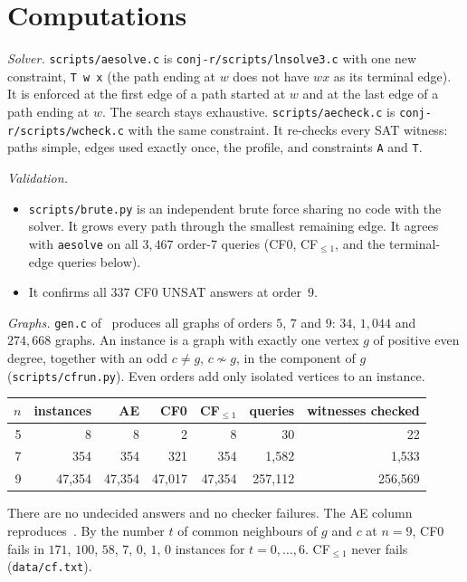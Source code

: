 \documentclass[11pt]{amsart}
\theoremstyle{definition}
\begin{document}
\section{Computations}\label{sec:data}

\emph{Solver.} \texttt{scripts/aesolve.c} is \texttt{conj-r/scripts/lnsolve3.c} with one new
constraint, \texttt{T w x} (the path ending at $w$ does not have $wx$ as its terminal edge). It is
enforced at the first edge of a path started at $w$ and at the last edge of a path ending at $w$.
The search stays exhaustive. \texttt{scripts/aecheck.c} is \texttt{conj-r/scripts/wcheck.c} with
the same constraint. It re-checks every SAT witness: paths simple, edges used exactly once, the
profile, and constraints \texttt{A} and \texttt{T}.

\emph{Validation.}
\begin{itemize}
\item \texttt{scripts/brute.py} is an independent brute force sharing no code with the solver. It
grows every path through the smallest remaining edge. It agrees with \texttt{aesolve} on all
$3{,}467$ order-7 queries (CF0, CF$_{\le1}$, and the terminal-edge queries below).
\item It confirms all $337$ CF0 UNSAT answers at order~$9$.
\end{itemize}

\emph{Graphs.} \texttt{gen.c} of~\cite{CR} produces all graphs of orders $5$, $7$ and $9$: $34$,
$1{,}044$ and $274{,}668$ graphs. An instance is a graph with exactly one vertex $g$ of positive
even degree, together with an odd $c\ne g$, $c\not\sim g$, in the component of $g$
(\texttt{scripts/cfrun.py}). Even orders add only isolated vertices to an instance.

\begin{center}
\begin{tabular}{rrrrrrr}
\toprule
$n$ & instances & AE & CF0 & CF$_{\le1}$ & queries & witnesses checked\\
\midrule
5 & 8 & 8 & 2 & 8 & 30 & 22\\
7 & 354 & 354 & 321 & 354 & 1{,}582 & 1{,}533\\
9 & 47{,}354 & 47{,}354 & 47{,}017 & 47{,}354 & 257{,}112 & 256{,}569\\
\bottomrule
\end{tabular}
\end{center}

There are no undecided answers and no checker failures. The AE column reproduces~\cite{CR}. By the
number $t$ of common neighbours of $g$ and $c$ at $n=9$, CF0 fails in $171$, $100$, $58$, $7$, $0$,
$1$, $0$ instances for $t=0,\dots,6$. CF$_{\le1}$ never fails (\texttt{data/cf.txt}).
\end{document}
